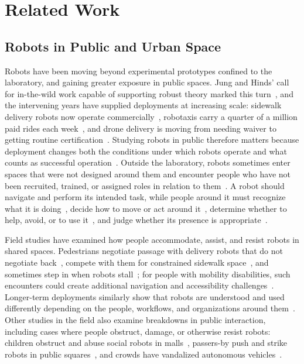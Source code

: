 \section{Related Work}
 \subsection{Robots in Public and Urban Space}
  Robots have been moving beyond experimental prototypes confined to the laboratory, and gaining greater exposure in public spaces. Jung and Hinds' call for in-the-wild work capable of supporting robust theory marked this turn~\cite{jung2018robots}, and the intervening years have supplied deployments at increasing scale: sidewalk delivery robots now operate commercially~\cite{starship2025}, robotaxis carry a quarter of a million paid rides each week~\cite{waymo2025rides}, and drone delivery is moving from needing waiver to getting routine certification~\cite{faa2025drone}. Studying robots in public therefore matters because deployment changes both the conditions under which robots operate and what counts as successful operation~\cite{jung2018robots}. Outside the laboratory, robots sometimes enter spaces that were not designed around them and encounter people who have not been recruited, trained, or assigned roles in relation to them~\cite{rosenthal2020forgotten}. A robot should navigate and perform its intended task, while people around it must recognize what it is doing~\cite{hetherington2021hey}, decide how to move or act around it~\cite{weinberg2023sharing}, determine whether to help, avoid, or to use it~\cite{weiss2010robots}, and judge whether its presence is appropriate~\cite{bu2025making}.
  
  Field studies have examined how people accommodate, assist, and resist robots in shared spaces. Pedestrians negotiate passage with delivery robots that do not negotiate back~\cite{pelikan2024encountering, yu2024understanding}, compete with them for constrained sidewalk space~\cite{weinberg2023sharing, gehrke2023observed}, and sometimes step in when robots stall~\cite{dobrosovestnova2022little}; for people with mobility disabilities, such encounters could create additional navigation and accessibility challenges~\cite{han2024codesign}. Longer-term deployments similarly show that robots are understood and used differently depending on the people, workflows, and organizations around them~\cite{mutlu2008robots, lee2012ripple, lee2010gracefully}. Other studies in the field also examine breakdowns in public interaction, including cases where people obstruct, damage, or otherwise resist robots: children obstruct and abuse social robots in malls~\cite{brscic2015escaping, nomura2016why}, passers-by push and strike robots in public squares~\cite{salvini2010safe}, and crowds have vandalized autonomous vehicles~\cite{sfstandard2024waymo}. 

